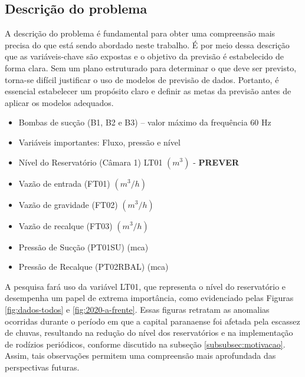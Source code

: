 \subsection{Descri\c c\~ao do problema} \label{subsec:descricao}

A descrição do problema é fundamental para obter uma compreensão mais precisa do que está sendo abordado neste trabalho. É por meio dessa descrição que as variáveis-chave são expostas e o objetivo da previsão é estabelecido de forma clara. Sem um plano estruturado para determinar o que deve ser previsto, torna-se difícil justificar o uso de modelos de previsão de dados. Portanto, é essencial estabelecer um propósito claro e definir as metas da previsão antes de aplicar os modelos adequados.

\begin{itemize}
	\item Bombas de sucção (B1, B2 e B3) – valor máximo da frequência 60 Hz
	
	\item[] Variáveis importantes: Fluxo, pressão e nível
	
	\item Nível do Reservatório (Câmara 1) LT01 $ (m^3) $ - \textbf{PREVER}
	
	\item Vazão de entrada (FT01) $ (m^3/h) $
	
	\item Vazão de gravidade (FT02) $ (m^3/h) $
	
	\item Vazão de recalque (FT03) $ (m^3/h) $
	
	\item Pressão de Sucção (PT01SU) (mca)
	
	\item Pressão de Recalque (PT02RBAL) (mca)
\end{itemize}

A pesquisa fará uso da variável LT01, que representa o nível do reservatório e desempenha um papel de extrema importância, como evidenciado pelas Figuras \ref{fig:dados-todos} e \ref{fig:2020-a-frente}. Essas figuras retratam as anomalias ocorridas durante o período em que a capital paranaense foi afetada pela escassez de chuvas, resultando na redução do nível dos reservatórios e na implementação de rodízios periódicos, conforme discutido na subseção \ref{subsubsec:motivacao}. Assim, tais observações permitem uma compreensão mais aprofundada das perspectivas futuras.

